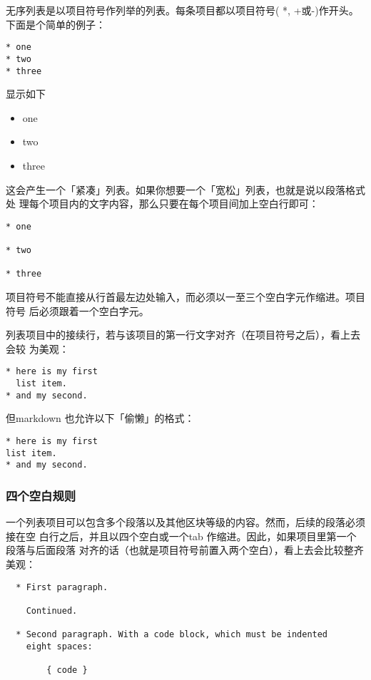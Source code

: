 \documentclass[fancyhdr,bookmark]{ctexbook}
\providecommand{\tightlist}{%
  \setlength{\itemsep}{0pt}\setlength{\parskip}{0pt}}
\begin{document}
无序列表是以项目符号作列举的列表。每条项目都以项目符号( *, +或-)作开头。
下面是个简单的例子：

\begin{lstlisting}
* one
* two
* three
\end{lstlisting}

显示如下

\begin{itemize}
\tightlist
\item
  one
\item
  two
\item
  three
\end{itemize}

这会产生一个「紧凑」列表。如果你想要一个「宽松」列表，也就是说以段落格式处
理每个项目内的文字内容，那么只要在每个项目间加上空白行即可：

\begin{lstlisting}
* one

* two

* three
\end{lstlisting}

项目符号不能直接从行首最左边处输入，而必须以一至三个空白字元作缩进。项目符号
后必须跟着一个空白字元。

列表项目中的接续行，若与该项目的第一行文字对齐（在项目符号之后），看上去会较
为美观：

\begin{lstlisting}
* here is my first
  list item.
* and my second.
\end{lstlisting}

但markdown 也允许以下「偷懒」的格式：

\begin{lstlisting}
* here is my first
list item.
* and my second.
\end{lstlisting}

\hypertarget{ux56dbux4e2aux7a7aux767dux89c4ux5219}{%
\subsubsection{四个空白规则}\label{ux56dbux4e2aux7a7aux767dux89c4ux5219}}

一个列表项目可以包含多个段落以及其他区块等级的内容。然而，后续的段落必须接在空
白行之后，并且以四个空白或一个tab
作缩进。因此，如果项目里第一个段落与后面段落
对齐的话（也就是项目符号前置入两个空白），看上去会比较整齐美观：

\begin{lstlisting}
  * First paragraph.

    Continued.

  * Second paragraph. With a code block, which must be indented
    eight spaces:

        { code }
\end{lstlisting}
\end{document}
